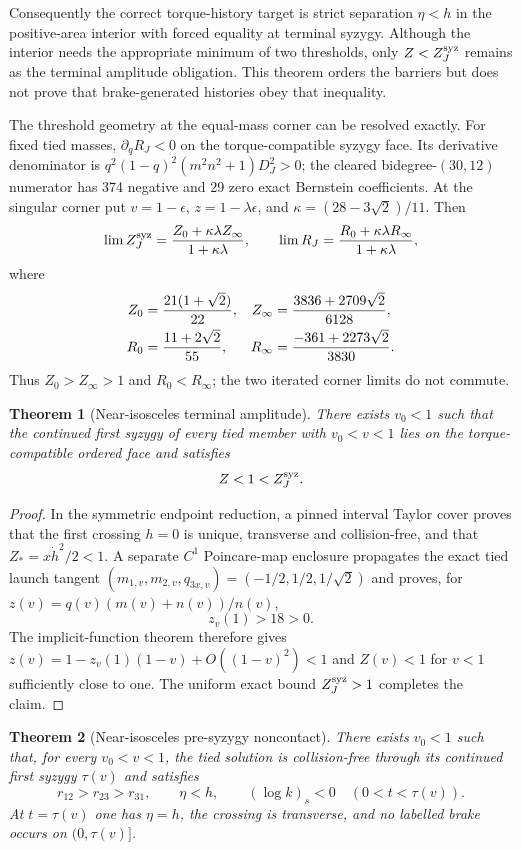 \documentclass[11pt]{article}
\newtheorem{theorem}{Theorem}
\begin{document}
Consequently the correct torque-history target is strict separation
$\eta<h$ in the positive-area interior with forced equality at terminal
syzygy.  Although the interior needs the appropriate minimum of two
thresholds, only $Z<Z_J^{\rm syz}$ remains as the terminal amplitude
obligation.  This theorem orders the barriers but does not prove that
brake-generated histories obey that inequality.

The threshold geometry at the equal-mass corner can be resolved exactly.
For fixed tied masses, $\partial_qR_J<0$ on the torque-compatible syzygy
face.  Its derivative denominator is
$q^2(1-q)^2(m^2n^2+1)D_J^2>0$; the cleared bidegree-$(30,12)$ numerator has
374 negative and 29 zero exact Bernstein coefficients.  At the singular
corner put $v=1-\epsilon$, $z=1-\lambda\epsilon$, and
$\kappa=(28-3\sqrt2)/11$.  Then
\[
 \lim Z_J^{\rm syz}
 ={Z_0+\kappa\lambda Z_\infty\over1+\kappa\lambda},\qquad
 \lim R_J
 ={R_0+\kappa\lambda R_\infty\over1+\kappa\lambda},
\]
where
\[
\begin{aligned}
Z_0&={21(1+\sqrt2)\over22},&
Z_\infty&={3836+2709\sqrt2\over6128},\\
R_0&={11+2\sqrt2\over55},&
R_\infty&={-361+2273\sqrt2\over3830}.
\end{aligned}
\]
Thus $Z_0>Z_\infty>1$ and $R_0<R_\infty$; the two iterated corner limits
do not commute.

\begin{theorem}[Near-isosceles terminal amplitude]
There exists $v_0<1$ such that the continued first syzygy of every tied
member with $v_0<v<1$ lies on the torque-compatible ordered face and
satisfies
\[
 Z<1<Z_J^{\rm syz}.
\]
\end{theorem}
\begin{proof}
In the symmetric endpoint reduction, a pinned interval Taylor cover proves
that the first crossing $h=0$ is unique, transverse and collision-free, and
that $Z_*=x\dot h^2/2<1$.  A separate $C^1$ Poincare-map enclosure propagates
the exact tied launch tangent
$(m_{1,v},m_{2,v},q_{3x,v})=(-1/2,1/2,1/\sqrt2)$ and proves, for
$z(v)=q(v)(m(v)+n(v))/n(v)$,
\[
 z_v(1)>18>0.
\]
The implicit-function theorem therefore gives
$z(v)=1-z_v(1)(1-v)+O((1-v)^2)<1$ and $Z(v)<1$ for $v<1$ sufficiently
close to one.  The uniform exact bound $Z_J^{\rm syz}>1$ completes the
claim.
\end{proof}

\begin{theorem}[Near-isosceles pre-syzygy noncontact]
There exists $v_0<1$ such that, for every $v_0<v<1$, the tied solution is
collision-free through its continued first syzygy $\tau(v)$ and satisfies
\[
 r_{12}>r_{23}>r_{31},\qquad \eta<h,\qquad (\log k)_s<0
 \quad (0<t<\tau(v)).
\]
At $t=\tau(v)$ one has $\eta=h$, the crossing is transverse, and no labelled
brake occurs on $(0,\tau(v)]$.
\end{theorem}
\end{document}
